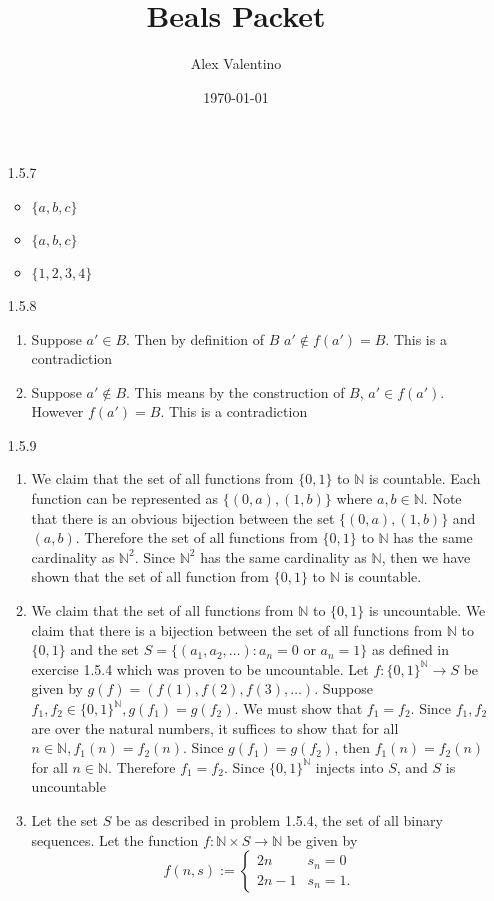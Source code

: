 \documentclass[12pt, letterpaper]{article}
\date{\today}
\author{Alex Valentino}
\title{Beals Packet}
\newcommand{\N}{\mathbb{N}}
\begin{document}
	\begin{enumerate}
		\item[1.5.7]
			\begin{itemize}
				\item $\{a,b,c\}$
				\item $\{a,b,c\}$
				\item $\{1,2,3,4\}$
			\end{itemize}
		\item[1.5.8]
			\begin{enumerate}
				\item Suppose $a' \in B$.  Then by definition of $B$ $a' \not \in f(a') = B$.  This is a contradiction
				\item Suppose $a' \not \in B$.  This means by the construction of $B$, $a' \in f(a')$.  However $f(a') = B$.  This is a contradiction
			\end{enumerate}
		\item[1.5.9]
			\begin{enumerate}
				\item We claim that the set of all functions from $\{0,1\}$ to $\N$ is countable.  Each function can be represented as $\{(0,a),(1,b)\}$ where $a,b \in \N$.  Note that there is an obvious bijection between the set $\{(0,a),(1,b)\}$ and $(a,b)$.  Therefore the set of all functions from $\{0,1\}$ to $\N$ has the same cardinality as $\N^2$.  Since $\N^2$ has the same cardinality as $\N$, then we have shown that the set of all function from $\{0,1\}$ to $\N$ is countable.  
				\item We claim that the set of all functions from $\N$ to $\{0,1\}$ is uncountable.  We claim that there is a bijection between the set of all functions from $\N$ to $\{0,1\}$ and the set $S = \{(a_1,a_2,\ldots):a_n = 0 \text{ or } a_n = 1\}$ as defined in exercise 1.5.4 which was proven to be uncountable.  Let $f: \{0,1\}^\N \to S$ be given by $g(f) = (f(1),f(2),f(3),\ldots)$.  Suppose $f_1,f_2 \in \{0,1\}^\N, g(f_1) = g(f_2)$.  We must show that $f_1 = f_2$.  Since $f_1, f_2$ are over the natural numbers, it suffices to show that for all $n \in \N, f_1(n) = f_2(n)$. Since $g(f_1) = g(f_2)$, then $f_1(n) = f_2(n)$ for all $n \in \N$.  Therefore $f_1 = f_2$.  Since $\{0,1\}^\N$ injects into $S$, and $S$ is uncountable
				\item Let the set $S$ be as described in problem 1.5.4, the set of all binary sequences.  Let the function $f: \N \times S \to \N$ be given by 
				$$
				f(n,s) := \begin{cases} 2n & s_n = 0\\ 2n -1 & s_n = 1. \end{cases}
$$
\end{enumerate}
\end{enumerate}
\end{document}
